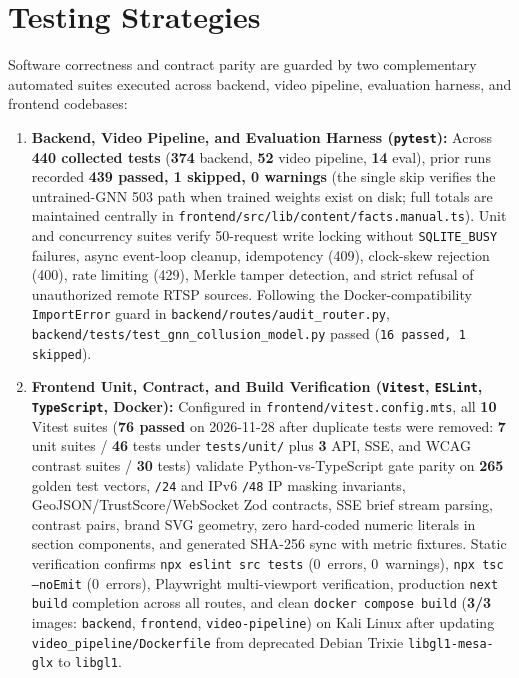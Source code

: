 \section{Testing Strategies}
Software correctness and contract parity are guarded by two complementary automated suites executed across backend, video pipeline, evaluation harness, and frontend codebases:
\begin{enumerate}
  \item \textbf{Backend, Video Pipeline, and Evaluation Harness (\texttt{pytest}):} Across \textbf{440 collected tests} (\textbf{374} backend, \textbf{52} video pipeline, \textbf{14} eval), prior runs recorded \textbf{439 passed, 1 skipped, 0 warnings} (the single skip verifies the untrained-GNN 503 path when trained weights exist on disk; full totals are maintained centrally in \texttt{frontend/src/lib/content/facts.manual.ts}). Unit and concurrency suites verify 50-request write locking without \texttt{SQLITE\_BUSY} failures, async event-loop cleanup, idempotency (409), clock-skew rejection (400), rate limiting (429), Merkle tamper detection, and strict refusal of unauthorized remote RTSP sources. Following the Docker-compatibility \texttt{ImportError} guard in \texttt{backend/routes/audit\_router.py}, \texttt{backend/tests/test\_gnn\_collusion\_model.py} passed (\texttt{16 passed, 1 skipped}).
  \item \textbf{Frontend Unit, Contract, and Build Verification (\texttt{Vitest}, \texttt{ESLint}, \texttt{TypeScript}, Docker):} Configured in \texttt{frontend/vitest.config.mts}, all \textbf{10} Vitest suites (\textbf{76 passed} on 2026-11-28 after duplicate tests were removed: \textbf{7} unit suites / \textbf{46} tests under \texttt{tests/unit/} plus \textbf{3} API, SSE, and WCAG contrast suites / \textbf{30} tests) validate Python-vs-TypeScript gate parity on \textbf{265} golden test vectors, \texttt{/24} and IPv6 \texttt{/48} IP masking invariants, GeoJSON/TrustScore/WebSocket Zod contracts, SSE brief stream parsing, contrast pairs, brand SVG geometry, zero hard-coded numeric literals in section components, and generated SHA-256 sync with metric fixtures. Static verification confirms \texttt{npx eslint src tests} (0~errors, 0~warnings), \texttt{npx tsc --noEmit} (0~errors), Playwright multi-viewport verification, production \texttt{next build} completion across all routes, and clean \texttt{docker compose build} (\textbf{3/3} images: \texttt{backend}, \texttt{frontend}, \texttt{video-pipeline}) on Kali Linux after updating \texttt{video\_pipeline/Dockerfile} from deprecated Debian Trixie \texttt{libgl1-mesa-glx} to \texttt{libgl1}.
\end{enumerate}

